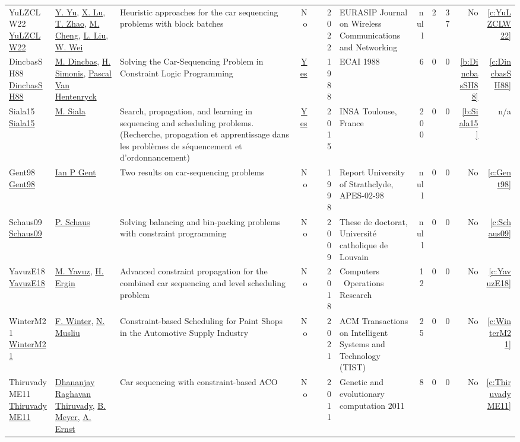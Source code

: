 {\begin{longtable}{>{\raggedright\arraybackslash}p{3cm}>{\raggedright\arraybackslash}p{6cm}>{\raggedright\arraybackslash}p{6.5cm}rrrp{2.5cm}rrrrr}
YuLZCLW22 \href{http://dx.doi.org/10.1186/s13638-022-02113-7}{YuLZCLW22} & \hyperref[auth:a55]{Y. Yu}, \hyperref[auth:a56]{X. Lu}, \hyperref[auth:a57]{T. Zhao}, \hyperref[auth:a58]{M. Cheng}, \hyperref[auth:a59]{L. Liu}, \hyperref[auth:a60]{W. Wei} & Heuristic approaches for the car sequencing problems with block batches & No & \cite{YuLZCLW22} & 2022 & EURASIP Journal on Wireless Communications and Networking & null & 2 & 37 & No & \ref{c:YuLZCLW22}\\
DincbasSH88 \href{}{DincbasSH88} & \hyperref[auth:a2]{M. Dincbas}, \hyperref[auth:a3]{H. Simonis}, \hyperref[auth:a4]{Pascal Van Hentenryck} & Solving the Car-Sequencing Problem in Constraint Logic Programming & \href{cars/works/DincbasSH88.pdf}{Yes} & \cite{DincbasSH88} & 1988 & ECAI 1988 & 6 & 0 & 0 & \ref{b:DincbasSH88} & \ref{c:DincbasSH88}\\
Siala15 \href{https://tel.archives-ouvertes.fr/tel-01164291}{Siala15} & \hyperref[auth:a11]{M. Siala} & Search, propagation, and learning in sequencing and scheduling problems. (Recherche, propagation et apprentissage dans les probl{\`{e}}mes de s{\'{e}}quencement et d'ordonnancement) & \href{cars/works/Siala15.pdf}{Yes} & \cite{Siala15} & 2015 & {INSA} Toulouse, France & 200 & 0 & 0 & \ref{b:Siala15} & n/a\\
Gent98 \href{}{Gent98} & \hyperref[auth:a18]{Ian P Gent} & Two results on car-sequencing problems & No & \cite{Gent98} & 1998 & Report University of Strathclyde, APES-02-98 & null & 0 & 0 & No & \ref{c:Gent98}\\
Schaus09 \href{}{Schaus09} & \hyperref[auth:a19]{P. Schaus} & Solving balancing and bin-packing problems with constraint programming & No & \cite{Schaus09} & 2009 & These de doctorat, Universit{\'e} catholique de Louvain & null & 0 & 0 & No & \ref{c:Schaus09}\\
YavuzE18 \href{}{YavuzE18} & \hyperref[auth:a22]{M. Yavuz}, \hyperref[auth:a23]{H. Ergin} & Advanced constraint propagation for the combined car sequencing and level scheduling problem & No & \cite{YavuzE18} & 2018 & Computers \  Operations Research & 12 & 0 & 0 & No & \ref{c:YavuzE18}\\
WinterM21 \href{}{WinterM21} & \hyperref[auth:a24]{F. Winter}, \hyperref[auth:a25]{N. Musliu} & Constraint-based Scheduling for Paint Shops in the Automotive Supply Industry & No & \cite{WinterM21} & 2021 & ACM Transactions on Intelligent Systems and Technology (TIST) & 25 & 0 & 0 & No & \ref{c:WinterM21}\\
ThiruvadyME11 \href{}{ThiruvadyME11} & \hyperref[auth:a26]{Dhananjay Raghavan Thiruvady}, \hyperref[auth:a27]{B. Meyer}, \hyperref[auth:a28]{A. Ernst} & Car sequencing with constraint-based ACO & No & \cite{ThiruvadyME11} & 2011 & Genetic and evolutionary computation 2011 & 8 & 0 & 0 & No & \ref{c:ThiruvadyME11}\\

\end{longtable}}
